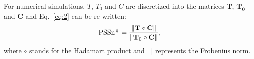 \documentclass{gmto}
\begin{document}





For numerical simulations, $T$, $T_0$ and $C$ are discretized into the matrices
$\mathbf{T}$, $\mathbf{T_0}$ and $\mathbf{C}$ and Eq.~\eqref{eq:2} can be re-written:
\begin{equation}
  \label{eq:17}
\displaystyle\mathrm{PSSn}^{1\over2} = {\left\Vert
    \mathbf{T}\circ\mathbf{C}\right\Vert\over\left\Vert
    \mathbf{T}_0\circ\mathbf{C}\right\Vert},
\end{equation}
where $\circ$ stands for the Hadamart product and $\left\Vert \right\Vert$
represents the Frobenius norm.

\end{document}
